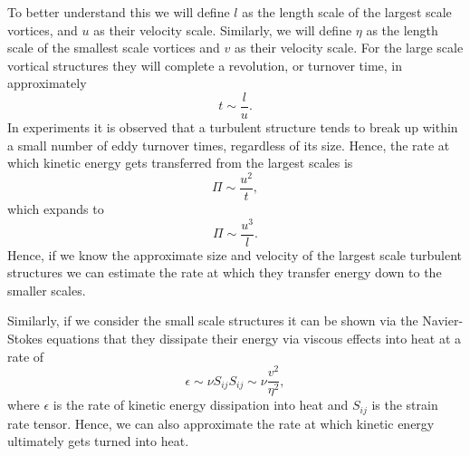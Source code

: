 To better understand this we will define $l$ as the length scale of the largest scale vortices, and $u$ as their velocity scale. Similarly, we will define $\eta$ as the length scale of the smallest scale vortices and $v$ as their velocity scale. For the large scale vortical structures they will complete a revolution, or turnover time, in approximately
\begin{equation}
	t \sim \frac{l}{u}.
\end{equation}
In experiments it is observed that a turbulent structure tends to break up within a small number of eddy turnover times, regardless of its size. Hence, the rate at which kinetic energy gets transferred from the largest scales is
\begin{equation}
	\Pi \sim \frac{u^2}{t},
\end{equation}
which expands to 
\begin{equation}
	\Pi \sim \frac{u^3}{l}.
\end{equation}
Hence, if we know the approximate size and velocity of the largest scale turbulent structures we can estimate the rate at which they transfer energy down to the smaller scales.

Similarly, if we consider the small scale structures it can be shown via the Navier-Stokes equations that they dissipate their energy via viscous effects into heat at a rate of~\cite{davidson2015turbulence}
\begin{equation}
	\epsilon \sim \nu S_{ij} S_{ij} \sim \nu \frac{v^2}{\eta^2},
\end{equation}
where $\epsilon$ is the rate of kinetic energy dissipation into heat and $S_{ij}$ is the strain rate tensor. Hence, we can also approximate the rate at which kinetic energy ultimately gets turned into heat.

